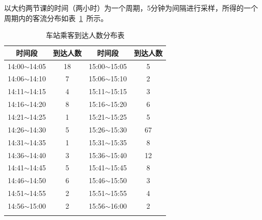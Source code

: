 以大约两节课的时间（两小时）为一个周期，5分钟为间隔进行采样，所得的一个周期内的客流分布如表~\ref{table_1}~所示。
\begin{table}[htbp!]
    \centering
    \caption{车站乘客到达人数分布表}\label{table_1}
    
    \begin{tabular}{cccc}
    \whline 
    时间段 & 到达人数 & 时间段 & 到达人数 \\ 
    \hline 
    14:00$ \sim $14:05 & 18 &15:00$ \sim $15:05&5\\ 
    14:06$ \sim $14:10 & 7 &15:06$ \sim $15:10&2\\ 
    14:11$ \sim $14:15 & 4 &15:11$ \sim $15:15&3\\ 
    14:16$ \sim $14:20 & 8 &15:16$ \sim $15:20&6\\ 
    14:21$ \sim $14:25 & 1 &15:21$ \sim $15:25&5\\ 
    14:26$ \sim $14:30 & 5 &15:26$ \sim $15:30&67\\ 
    14:31$ \sim $14:35 & 1 &15:31$ \sim $15:35&8\\ 
    14:36$ \sim $14:40 & 3 &15:36$ \sim $15:40&12\\ 
    14:41$ \sim $14:45 & 5 &15:41$ \sim $15:45&8\\ 
    14:46$ \sim $14:50 & 6 &15:46$ \sim $15:50&3\\ 
    14:51$ \sim $14:55 & 2 &15:51$ \sim $15:55&4\\ 
    14:56$ \sim $15:00 & 2 &15:56$ \sim $16:00&2\\ 
    \whline 
    \end{tabular}
    \end{table}